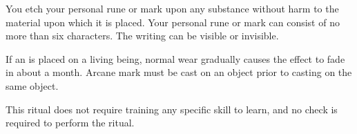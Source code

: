 \spellrng{\rngtouch}
\begin{spelleffect}
You etch your personal rune or mark upon any substance without harm to the material upon which it is placed. Your personal rune or mark can consist of no more than six characters. The writing can be visible or invisible.
\end{spelleffect}
\begin{spellnotes}
If an  is placed on a living being, normal wear gradually causes the effect to fade in about a month. Arcane mark must be cast on an object prior to casting  on the same object.

This ritual does not require training any specific skill to learn, and no check is required to perform the ritual.
\end{spellnotes}

